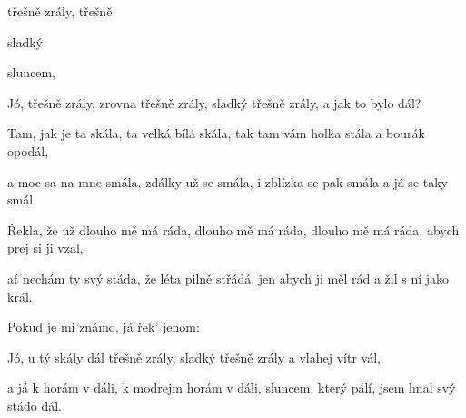 

\zs
{} třešně zrály,  třešně 

sladký      

     

sluncem,     
\ks

\zr
Jó, třešně zrály, zrovna třešně zrály, sladký třešně zrály, a jak to bylo dál?
\kr

\zs
Tam, jak je ta skála, ta velká bílá skála, tak tam vám holka stála a bourák opodál,

a moc sa na mne smála, zdálky už se smála, i zblízka se pak smála a já se taky smál.
\ks

\zr\kr

\zs
Řekla, že už dlouho mě má ráda, dlouho mě má ráda, dlouho mě má ráda, abych prej si ji vzal,

ať nechám ty svý stáda, že léta pilně střádá, jen abych ji měl rád a žil s ní jako král.
\ks

\zr\kr

\zs
Pokud je mi známo, já řek' jenom: 
\ks

\zr\kr

\zs
Jó, u tý skály dál třešně zrály, sladký třešně zrály a vlahej vítr vál,

a já k horám v dáli, k modrejm horám v dáli, sluncem, který pálí, jsem hnal svý stádo dál.
\ks

\kp
